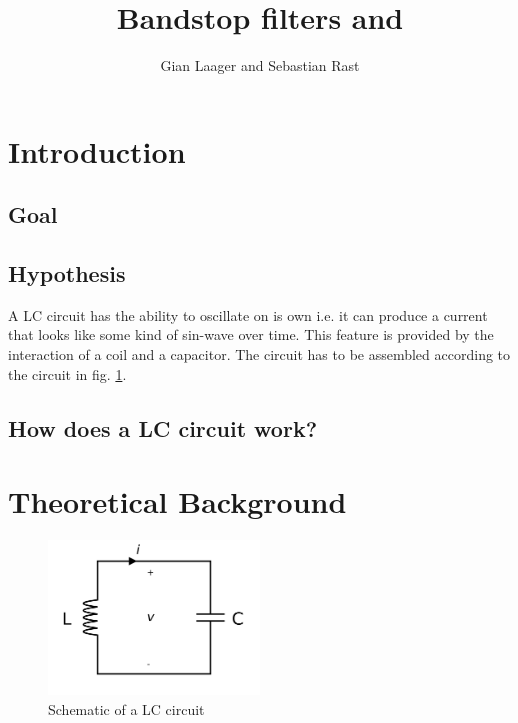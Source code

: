 \documentclass[a4paper,11pt]{article}
\title{Bandstop filters and }
\author{Gian Laager and Sebastian Rast}
\begin{document}
\maketitle

\section{Introduction}

\subsection{Goal}
\subsection{Hypothesis}

A LC circuit has the ability to oscillate on is own i.e. it can produce a current that looks like some kind of sin-wave over time. This feature is provided by the interaction of a coil and a capacitor. The circuit has to be assembled according to the circuit in fig. \ref{fig:lc}.
\subsection{How does a LC circuit work?}
\section{Theoretical Background}

\begin{figure}[!ht]
    \centering
    \includegraphics[width=0.5\textwidth]{images/2560px-LC_parallel_simple.svg.png}
    \caption{Schematic of a LC circuit}
    \label{fig:lc}
\end{figure}
\end{document}
